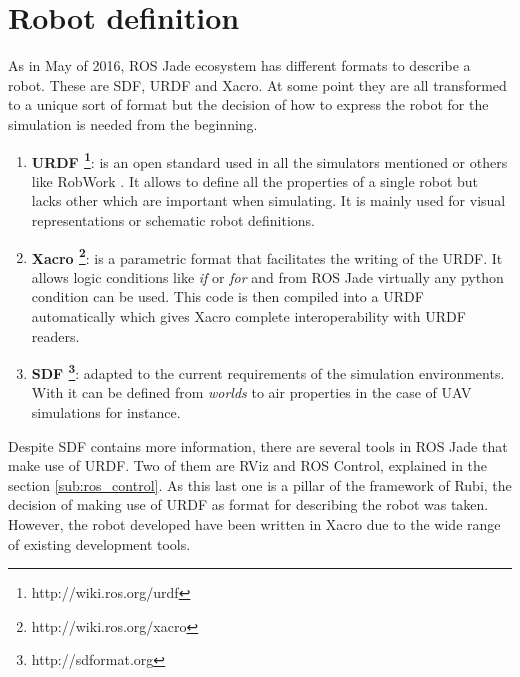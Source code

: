 \section{Robot definition} %
\label{sec:robot_definition}
As in May of 2016, ROS Jade ecosystem has different formats to describe a robot.
These are SDF, URDF and Xacro.
At some point they are all transformed to a unique sort of format but the decision of how to express the robot for the simulation is needed from the beginning.


\begin{enumerate}
  \item \textbf{URDF \footnote{http://wiki.ros.org/urdf}}: is an open standard used in all the simulators mentioned or others like RobWork \cite{robwork}. 
  It allows to define all the properties of a single robot but lacks other which are important when simulating. 
  It is mainly used for visual representations or schematic robot definitions.
  \item \textbf{Xacro \footnote{http://wiki.ros.org/xacro}}: is a parametric format that facilitates the writing of the URDF.
  It allows logic conditions like \textit{if} or \textit{for} and from ROS Jade  virtually any python condition can be used.
  This code is then compiled into a URDF automatically which gives Xacro complete interoperability with URDF readers.
  \item \textbf{SDF \footnote{http://sdformat.org}}: adapted to the current requirements of the simulation environments.
  With it can be defined from \textit{worlds} to air properties in the case of UAV simulations for instance.
\end{enumerate}

Despite SDF contains more information, there are several tools in ROS Jade that make use of URDF.
Two of them are RViz and ROS Control, explained in the section \ref{sub:ros_control}.
As this last one is a pillar of the framework of Rubi, the decision of making use of URDF as format for describing the robot was taken.
However, the robot developed have been written in Xacro due to the wide range of existing development tools.

